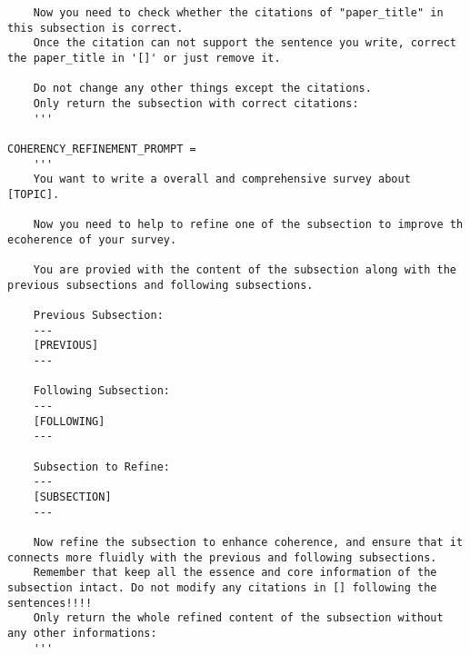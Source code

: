 \begin{lstlisting}
    Now you need to check whether the citations of "paper_title" in this subsection is correct.
    Once the citation can not support the sentence you write, correct the paper_title in '[]' or just remove it.

    Do not change any other things except the citations.
    Only return the subsection with correct citations:
    '''

COHERENCY_REFINEMENT_PROMPT = 
    '''
    You want to write a overall and comprehensive survey about [TOPIC].
    
    Now you need to help to refine one of the subsection to improve th ecoherence of your survey.
    
    You are provied with the content of the subsection along with the previous subsections and following subsections.
    
    Previous Subsection:
    --- 
    [PREVIOUS]
    ---
    
    Following Subsection:
    ---
    [FOLLOWING]
    ---
    
    Subsection to Refine: 
    ---
    [SUBSECTION]
    ---
    
    Now refine the subsection to enhance coherence, and ensure that it connects more fluidly with the previous and following subsections. 
    Remember that keep all the essence and core information of the subsection intact. Do not modify any citations in [] following the sentences!!!!
    Only return the whole refined content of the subsection without any other informations:
    '''

\end{lstlisting}
\newpage
\label{appendix:survey_example}
